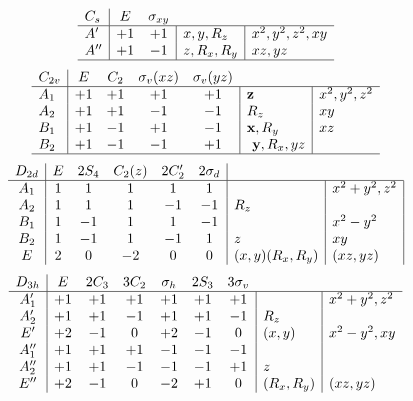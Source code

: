 \[
\begin{array}{l|cc|l|l}
 C_{s}  & E & \multicolumn{1}{c}{\sigma_{xy}} &  \multicolumn{1}{c}{} & \\
\hline
 A' & +1 & +1 &  x, y, R_z & x^{2}, y^{2}, z^{2}, xy \\
 A'' & +1 & -1 &  z, R_x, R_y & xz, yz \\
 \hline
 \end{array}
\]
\[
\begin{array}{l|cccc|l|l}
 C_{2v}  & E & C_2 & \multicolumn{1}{c}{\sigma_{v} (xz)}  & \multicolumn{1}{c}{\sigma_{v} (yz)} &  \multicolumn{1}{c}{}  & \\
\hline
 A_{1} & +1  & +1  & +1  & +1  & \textbf{z} & x^{2}, y^{2}, z^{2} \\
 A_{2} & +1  & +1  & -1  & -1  & R_{z} & xy \\
 B_{1} & +1  & -1  & +1  & -1  & \textbf{x}, R_y & xz \\
 B_{2} & +1  & -1  & -1  & +1  &\textbf{ y}, R_x, yz \\
 \hline
\end{array}
\]
\[
\begin{array}{c|ccccc|l|l|l}
D_{2d} & E & 2S_4 & C_2(z) & 2C'_2 &2\sigma_d & \multicolumn{1}{c} {\;} & \multicolumn{1}{c}{}  \\
\hline
A_1&	1&	1&	1&	1&	1&		&x^2+y^2, z^2 \\
A_2&	1&	1&	1&	-1&	-1&	R_z	& \\
B_1&	1&	-1&	1&	1&	-1&		&x^2-y^2 \\
B_2&	1&	-1&	1&	-1&	1&	z	&xy \\
E&	2&	0&	-2&	0&	0&	(x, y) (R_x, R_y)&	(xz, yz)\\
\end{array}
\]
\[
\begin{array}{c|cccccc|l|l}
D_{3h} & E & 2C_3 & 3C_2 & \sigma_h & 2S_3 & \multicolumn{1}{c}{3\sigma_v} & \multicolumn{1}{c}{} & \\
\hline
A'_1 & +1  &  +1  &  +1  &  +1  &  +1  &  +1  &     & x^2+y^2,z^2 \\
A'_2 & +1  &  +1  & -1  &  +1  &  +1  & -1  & R_z & \\
E'     & +2 & -1  &  0 &  +2 & -1  &   0 &  (x, y) & x^2-y^2, xy \\
A''_1& +1  &  +1  &  +1  & -1  & -1  & -1  & & \\
A''_2& +1  &  +1  & -1  & -1  & -1  &  +1  &  z & \\
E''    & +2 & -1  &  0 & -2 &  +1  &  0 &  (R_x, R_y) & (xz, yz) \\
\end{array}
\]
